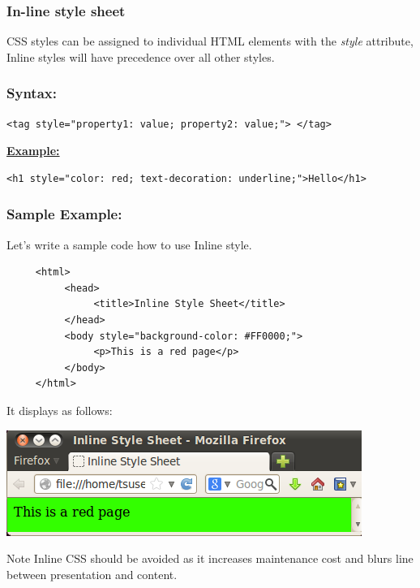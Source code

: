\documentclass[11pt,a4paper]{article}
\begin{document}
\subsubsection*{In-line style sheet}

CSS styles can be assigned to individual HTML elements with the \emph{style} attribute,
Inline styles will have precedence over all other styles.


\subsubsection*{Syntax:}

\begin{verbatim}<tag style="property1: value; property2: value;"> </tag>\end{verbatim}
\underline{\textbf{Example:}}

\begin{verbatim}<h1 style="color: red; text-decoration: underline;">Hello</h1>\end{verbatim}

\subsubsection*{Sample Example:}

\hspace{1cm}Let's write a sample code how to use Inline style.
\begin{verbatim}
     <html>
          <head>
               <title>Inline Style Sheet</title>
          </head>
          <body style="background-color: #FF0000;">
               <p>This is a red page</p>
          </body>
     </html>
\end{verbatim}
It displays as follows:

\begin{center}
\includegraphics[scale=0.7]{InlineStyleSheet}\\
\end{center}

\begin{bclogo}[couleur=blue!5, arrondi=0.3, logo=\bctrombone]{Note}
Inline CSS should be avoided as it increases maintenance cost and blurs line between presentation and content.
\end{bclogo}
\end{document}
